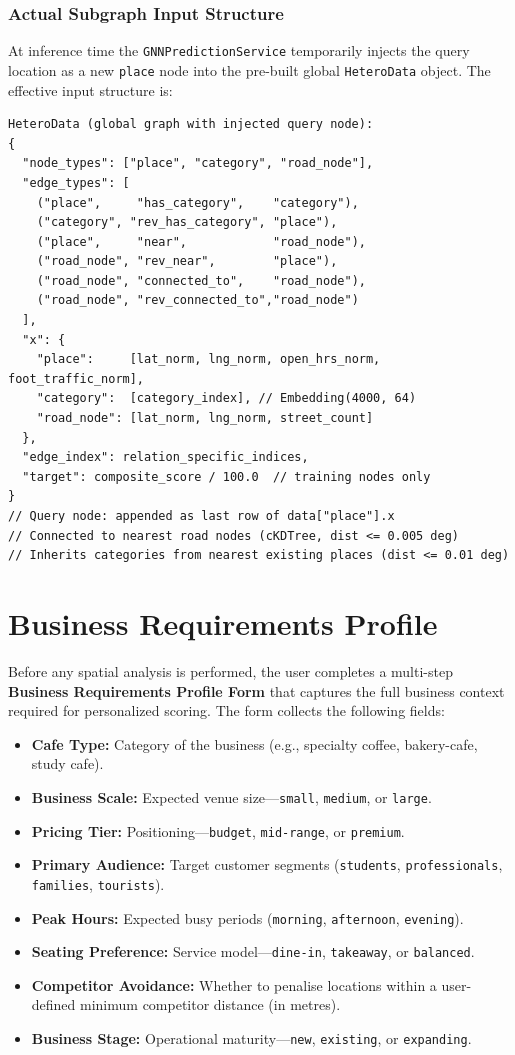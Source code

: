 \subsubsection{Actual Subgraph Input Structure}
At inference time the \texttt{GNNPredictionService} temporarily injects the query location as a new \texttt{place} node into the pre-built global \texttt{HeteroData} object. The effective input structure is:
{\small
\begin{verbatim}
HeteroData (global graph with injected query node):
{
  "node_types": ["place", "category", "road_node"],
  "edge_types": [
    ("place",     "has_category",    "category"),
    ("category", "rev_has_category", "place"),
    ("place",     "near",            "road_node"),
    ("road_node", "rev_near",        "place"),
    ("road_node", "connected_to",    "road_node"),
    ("road_node", "rev_connected_to","road_node")
  ],
  "x": {
    "place":     [lat_norm, lng_norm, open_hrs_norm, foot_traffic_norm],
    "category":  [category_index], // Embedding(4000, 64)
    "road_node": [lat_norm, lng_norm, street_count]
  },
  "edge_index": relation_specific_indices,
  "target": composite_score / 100.0  // training nodes only
}
// Query node: appended as last row of data["place"].x
// Connected to nearest road nodes (cKDTree, dist <= 0.005 deg)
// Inherits categories from nearest existing places (dist <= 0.01 deg)
\end{verbatim}
}

\section{Business Requirements Profile}
Before any spatial analysis is performed, the user completes a multi-step \textbf{Business Requirements Profile Form} that captures the full business context required for personalized scoring. The form collects the following fields:

\begin{itemize}
    \item \textbf{Cafe Type:} Category of the business (e.g., specialty coffee, bakery-cafe, study cafe).
    \item \textbf{Business Scale:} Expected venue size---\texttt{small}, \texttt{medium}, or \texttt{large}.
    \item \textbf{Pricing Tier:} Positioning---\texttt{budget}, \texttt{mid-range}, or \texttt{premium}.
    \item \textbf{Primary Audience:} Target customer segments (\texttt{students}, \texttt{professionals}, \texttt{families}, \texttt{tourists}).
    \item \textbf{Peak Hours:} Expected busy periods (\texttt{morning}, \texttt{afternoon}, \texttt{evening}).
    \item \textbf{Seating Preference:} Service model---\texttt{dine-in}, \texttt{takeaway}, or \texttt{balanced}.
    \item \textbf{Competitor Avoidance:} Whether to penalise locations within a user-defined minimum competitor distance (in metres).
    \item \textbf{Business Stage:} Operational maturity---\texttt{new}, \texttt{existing}, or \texttt{expanding}.
\end{itemize}

